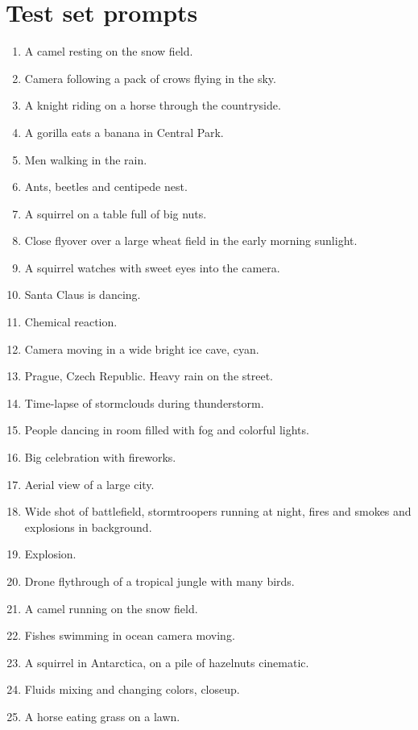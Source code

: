 \section{Test set prompts}
\label{sec:appendix.test_prompts}
\begin{enumerate}
    \item A camel resting on the snow field.
    \item Camera following a pack of crows flying in the sky.
    \item A knight riding on a horse through the countryside.
    \item A gorilla eats a banana in Central Park.
    \item Men walking in the rain.
    \item Ants, beetles and centipede nest.
    \item A squirrel on a table full of big nuts.
    \item Close flyover over a large wheat field in the early morning sunlight.
    \item A squirrel watches with sweet eyes into the camera.
    \item Santa Claus is dancing.
    \item Chemical reaction.
    \item Camera moving in a wide bright ice cave, cyan.
    \item Prague, Czech Republic. Heavy rain on the street.
    \item Time-lapse of stormclouds during thunderstorm.
    \item People dancing in room filled with fog and colorful lights.
    \item Big celebration with fireworks.
    \item Aerial view of a large city.
    \item Wide shot of battlefield, stormtroopers running at night, fires and smokes and explosions in background.
    \item Explosion.
    \item Drone flythrough of a tropical jungle with many birds.
    \item A camel running on the snow field.
    \item Fishes swimming in ocean camera moving.
    \item A squirrel in Antarctica, on a pile of hazelnuts cinematic.
    \item Fluids mixing and changing colors, closeup.
    \item A horse eating grass on a lawn.

\end{enumerate}
